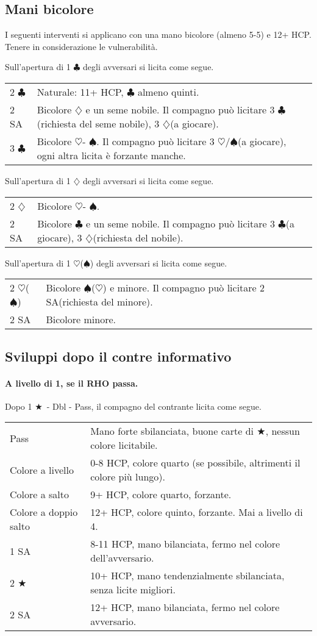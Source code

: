 \documentclass[a4paper,10pt]{article}
\renewcommand{\c}{$\clubsuit$\xspace}
\renewcommand{\d}{$\diamondsuit$\xspace}
\newcommand{\h}{$\heartsuit$\xspace}
\newcommand{\s}{$\spadesuit$\xspace}
\renewcommand{\j}{$\bigstar$\xspace}
\newcommand{\sa}{SA\xspace}
\newcommand{\smallspace}{\vskip0.3cm}
\newenvironment{twocol}
  {\smallspace\noindent\begin{tabular}{l p{0.78\textwidth}}}
  {\end{tabular}\smallspace}
\begin{document}
\subsection{Mani bicolore}

I seguenti interventi si applicano con una mano bicolore (almeno 5-5) e 12+ HCP. Tenere in considerazione le vulnerabilità.

Sull'apertura di 1 \c degli avversari si licita come segue.
\begin{twocol}
  2 \c & Naturale: 11+ HCP, \c almeno quinti.\\
  2 \sa & Bicolore \d e un seme nobile. Il compagno può licitare 3 \c (richiesta del seme nobile), 3 \d (a giocare).\\
  3 \c & Bicolore \h - \s. Il compagno può licitare 3 \h/\s (a giocare), ogni altra licita è forzante manche.
\end{twocol}

Sull'apertura di 1 \d degli avversari si licita come segue.
\begin{twocol}
  2 \d & Bicolore \h - \s.\\
  2 \sa & Bicolore \c e un seme nobile. Il compagno può licitare 3 \c (a giocare), 3 \d (richiesta del nobile).
\end{twocol}

Sull'apertura di 1 \h (\s) degli avversari si licita come segue.
\begin{twocol}
  2 \h (\s) & Bicolore \s (\h) e minore. Il compagno può licitare 2 \sa (richiesta del minore).\\
  2 \sa & Bicolore minore.
\end{twocol}


\subsection{Sviluppi dopo il contre informativo}

\paragraph{A livello di 1, se il RHO passa.} Dopo 1 \j\ - Dbl - Pass, il compagno del contrante licita come segue.

\begin{twocol}
	Pass & Mano forte sbilanciata, buone carte di \j, nessun colore licitabile. \\
	Colore a livello & 0-8 HCP, colore quarto (se possibile, altrimenti il colore più lungo). \\
	Colore a salto & 9+ HCP, colore quarto, forzante. \\
	Colore a doppio salto & 12+ HCP, colore quinto, forzante. Mai a livello di 4. \\
	1 \sa & 8-11 HCP, mano bilanciata, fermo nel colore dell'avversario. \\
	2 \j & 10+ HCP, mano tendenzialmente sbilanciata, senza licite migliori. \\
	2 \sa & 12+ HCP, mano bilanciata, fermo nel colore avversario. \\
\end{twocol}
\end{document}
